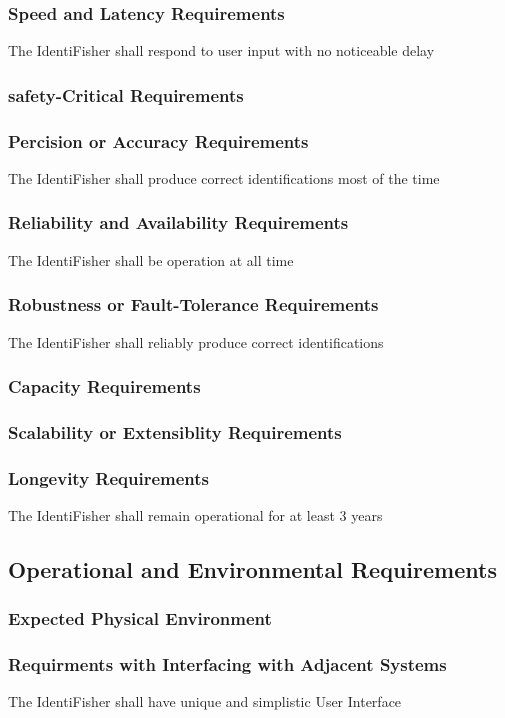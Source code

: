\documentclass{article}
\begin{document}
\subsubsection{Speed and Latency Requirements}
The IdentiFisher shall respond to user input with no noticeable delay
\subsubsection{safety-Critical Requirements}

\subsubsection{Percision or Accuracy Requirements}
The IdentiFisher shall produce correct identifications most of the time
\subsubsection{Reliability and Availability Requirements}
The IdentiFisher shall be operation at all time
\subsubsection{Robustness or Fault-Tolerance Requirements}
The IdentiFisher shall reliably produce correct identifications
\subsubsection{Capacity Requirements}
\subsubsection{Scalability or Extensiblity Requirements}
\subsubsection{Longevity Requirements}
The IdentiFisher shall remain operational for at least 3 years

\subsection{Operational and Environmental Requirements}
\subsubsection{Expected Physical Environment}
\subsubsection{Requirments with Interfacing with Adjacent Systems}
The IdentiFisher shall have unique and simplistic User Interface
\end{document}
